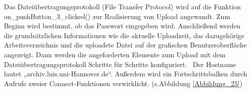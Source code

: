 Das Dateiübertragungsprotokoll (File Transfer Protocol) wird auf die Funktion on\_pushButton\_3\_clicked() zur Realisierung von Upload angewandt. Zum Beginn wird bestimmt, ob das Passwort eingegeben wird. Anschließend werden die grundsätzlichen Informationen wie die aktuelle Uploadzeit, das dazugehörige Arbeitsverzeichnis und die uploadete Datei auf der grafischen Benutzeroberfläche angezeigt. Dann werden die angeforderten Elemente zum Upload mit dem Dateiübertragungsprotokoll Schritte für Schritte konfiguriert.  Der Hostname lautet „archiv.luis.uni-Hannover.de“.  Außerdem wird ein Fortschrittsbalken durch Aufrufe zweier Connect-Funktionen verwirklicht. (s.Abbildung \ref{Abbildung_25})
